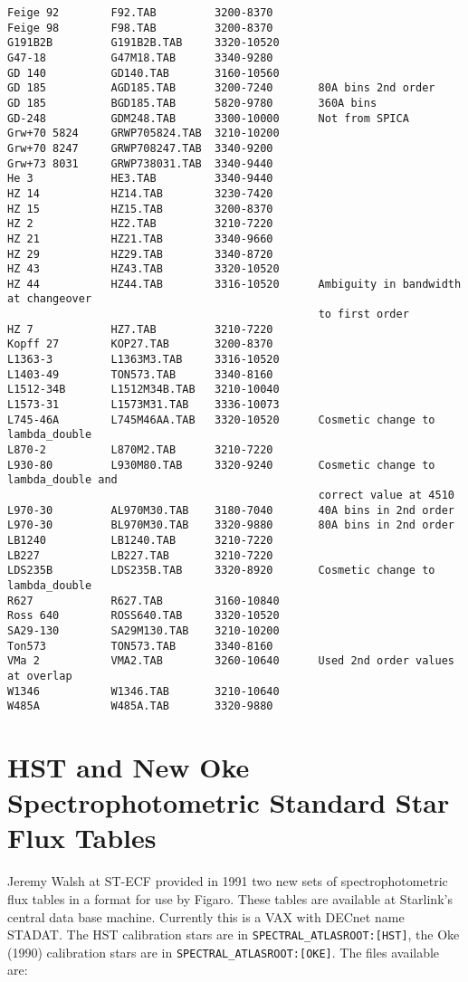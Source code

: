 \begin{verbatim}
Feige 92        F92.TAB         3200-8370
Feige 98        F98.TAB         3200-8370
G191B2B         G191B2B.TAB     3320-10520
G47-18          G47M18.TAB      3340-9280
GD 140          GD140.TAB       3160-10560
GD 185          AGD185.TAB      3200-7240       80A bins 2nd order
GD 185          BGD185.TAB      5820-9780       360A bins
GD-248          GDM248.TAB      3300-10000      Not from SPICA
Grw+70 5824     GRWP705824.TAB  3210-10200
Grw+70 8247     GRWP708247.TAB  3340-9200
Grw+73 8031     GRWP738031.TAB  3340-9440
He 3            HE3.TAB         3340-9440
HZ 14           HZ14.TAB        3230-7420
HZ 15           HZ15.TAB        3200-8370
HZ 2            HZ2.TAB         3210-7220
HZ 21           HZ21.TAB        3340-9660
HZ 29           HZ29.TAB        3340-8720
HZ 43           HZ43.TAB        3320-10520
HZ 44           HZ44.TAB        3316-10520      Ambiguity in bandwidth at changeover
                                                to first order
HZ 7            HZ7.TAB         3210-7220
Kopff 27        KOP27.TAB       3200-8370
L1363-3         L1363M3.TAB     3316-10520
L1403-49        TON573.TAB      3340-8160
L1512-34B       L1512M34B.TAB   3210-10040
L1573-31        L1573M31.TAB    3336-10073
L745-46A        L745M46AA.TAB   3320-10520      Cosmetic change to lambda_double
L870-2          L870M2.TAB      3210-7220
L930-80         L930M80.TAB     3320-9240       Cosmetic change to lambda_double and 
                                                correct value at 4510
L970-30         AL970M30.TAB    3180-7040       40A bins in 2nd order
L970-30         BL970M30.TAB    3320-9880       80A bins in 2nd order
LB1240          LB1240.TAB      3210-7220
LB227           LB227.TAB       3210-7220
LDS235B         LDS235B.TAB     3320-8920       Cosmetic change to lambda_double
R627            R627.TAB        3160-10840
Ross 640        ROSS640.TAB     3320-10520
SA29-130        SA29M130.TAB    3210-10200
Ton573          TON573.TAB      3340-8160
VMa 2           VMA2.TAB        3260-10640      Used 2nd order values at overlap
W1346           W1346.TAB       3210-10640
W485A           W485A.TAB       3320-9880
\end{verbatim}


\section{HST and New Oke Spectrophotometric Standard Star Flux Tables}

Jeremy Walsh at ST-ECF provided in 1991 two new sets of
spectrophotometric flux tables in a format for use by Figaro.  These
tables are available at Starlink's central data base machine.  Currently
this is a VAX with DECnet name STADAT.  The HST calibration stars are in
{\tt SPECTRAL\-\_ATLAS\-ROOT:[HST]}, the Oke (1990) calibration stars are in
{\tt SPECTRAL\-\_ATLAS\-ROOT:[OKE]}.  The files available are:

